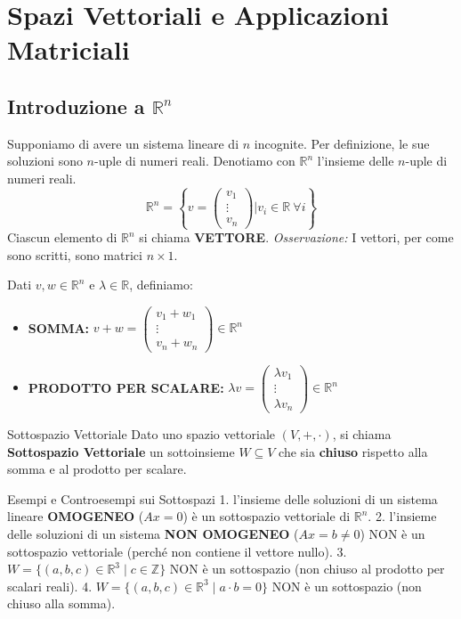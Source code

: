 \section{Spazi Vettoriali e Applicazioni Matriciali}

\subsection{Introduzione a $\mathbb{R}^n$}
Supponiamo di avere un sistema lineare di $n$ incognite. Per definizione, le sue soluzioni sono $n$-uple di numeri reali.
Denotiamo con $\mathbb{R}^n$ l'insieme delle $n$-uple di numeri reali.
$$ \mathbb{R}^n = \left\{ v = \begin{pmatrix} v_1 \\ \vdots \\ v_n \end{pmatrix} \Big| v_i \in \mathbb{R} \ \forall i \right\} $$
Ciascun elemento di $\mathbb{R}^n$ si chiama \textbf{VETTORE}.
\textit{Osservazione:} I vettori, per come sono scritti, sono matrici $n \times 1$.

\begin{definitionbox}
Dati $v, w \in \mathbb{R}^n$ e $\lambda \in \mathbb{R}$, definiamo:
\begin{itemize}
    \item \textbf{SOMMA:} $v + w = \begin{pmatrix} v_1 + w_1 \\ \vdots \\ v_n + w_n \end{pmatrix} \in \mathbb{R}^n$
    \item \textbf{PRODOTTO PER SCALARE:} $\lambda v = \begin{pmatrix} \lambda v_1 \\ \vdots \\ \lambda v_n \end{pmatrix} \in \mathbb{R}^n$
\end{itemize}
\end{definitionbox}

\begin{concept}{Sottospazio Vettoriale}
Dato uno spazio vettoriale $(V, +, \cdot)$, si chiama \textbf{Sottospazio Vettoriale} un sottoinsieme $W \subseteq V$ che sia \textbf{chiuso} rispetto alla somma e al prodotto per scalare.
\end{concept}

\begin{example}{Esempi e Controesempi sui Sottospazi}{}
1. l'insieme delle soluzioni di un sistema lineare \textbf{OMOGENEO} ($Ax = 0$) è un sottospazio vettoriale di $\mathbb{R}^n$.
2. l'insieme delle soluzioni di un sistema \textbf{NON OMOGENEO} ($Ax = b \neq 0$) NON è un sottospazio vettoriale (perché non contiene il vettore nullo).
3. $W = \{ (a,b,c) \in \mathbb{R}^3 \mid c \in \mathbb{Z} \}$ NON è un sottospazio (non chiuso al prodotto per scalari reali).
4. $W = \{ (a,b,c) \in \mathbb{R}^3 \mid a \cdot b = 0 \}$ NON è un sottospazio (non chiuso alla somma).
\end{example}

